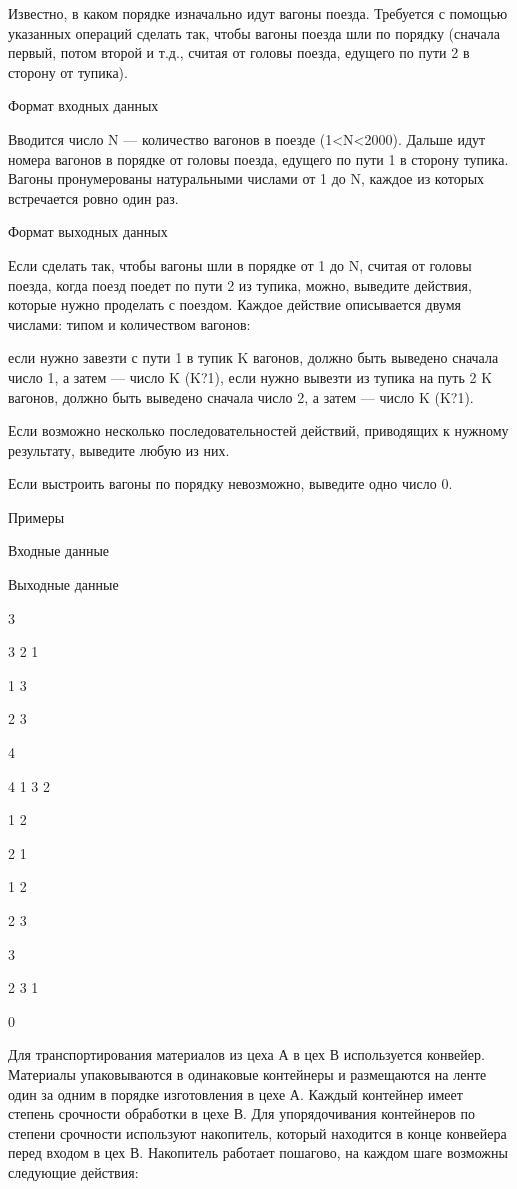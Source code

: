 \documentclass[]{article}
\begin{document}
\begin{enumerate}
Известно, в каком порядке изначально идут вагоны поезда. Требуется с помощью указанных операций сделать так, чтобы вагоны поезда шли по порядку (сначала первый, потом второй и т.д., считая от головы поезда, едущего по пути 2 в сторону от тупика).

Формат входных данных

Вводится число N — количество вагонов в поезде (1<N<2000). Дальше идут номера вагонов в порядке от головы поезда, едущего по пути 1 в сторону тупика. Вагоны пронумерованы натуральными числами от 1 до N, каждое из которых встречается ровно один раз.

Формат выходных данных

Если сделать так, чтобы вагоны шли в порядке от 1 до N, считая от головы поезда, когда поезд поедет по пути 2 из тупика, можно, выведите действия, которые нужно проделать с поездом. Каждое действие описывается двумя числами: типом и количеством вагонов:

    если нужно завезти с пути 1 в тупик K вагонов, должно быть выведено сначала число 1, а затем — число K (K?1),
    если нужно вывезти из тупика на путь 2 K вагонов, должно быть выведено сначала число 2, а затем — число K (K?1).

Если возможно несколько последовательностей действий, приводящих к нужному результату, выведите любую из них.

Если выстроить вагоны по порядку невозможно, выведите одно число 0.

Примеры

Входные данные
	

Выходные данные

3

3 2 1
	

1 3

2 3

4

4 1 3 2
	

1 2

2 1

1 2

2 3

3

2 3 1
	

0

Для транспортирования материалов из цеха А в цех В используется конвейер. Материалы упаковываются в одинаковые контейнеры и размещаются на ленте один за одним в порядке изготовления в цехе А. Каждый контейнер имеет степень срочности обработки в цехе В. Для упорядочивания контейнеров по степени срочности используют накопитель, который находится в конце конвейера перед входом в цех В. Накопитель работает пошагово, на каждом шаге возможны следующие действия:


\end{enumerate}
\end{document}
